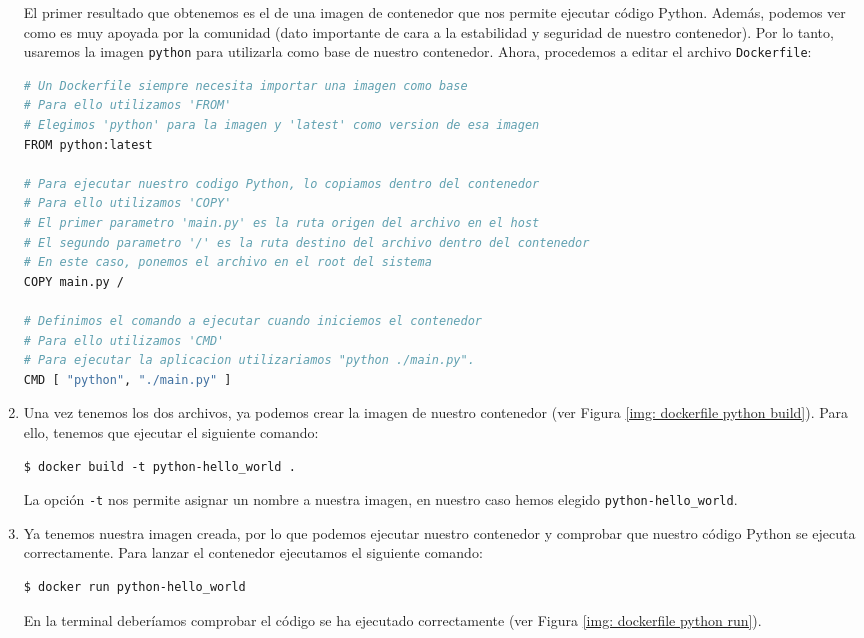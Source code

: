\documentclass[a4paper, oneside, 12pt]{book}
\begin{document}
\begin{enumerate}
	\noindent El primer resultado que obtenemos es el de una imagen de contenedor que nos permite ejecutar código Python. Además, podemos ver como es muy apoyada por la comunidad (dato importante de cara a la estabilidad y seguridad de nuestro contenedor). Por lo tanto, usaremos la imagen \texttt{python} para utilizarla como base de nuestro contenedor. Ahora, procedemos a editar el archivo \texttt{Dockerfile}:
	\begin{lstlisting}[language=bash, caption={Contenido del archivo Dockerfile para crear contenedor con código Python}]
# Un Dockerfile siempre necesita importar una imagen como base
# Para ello utilizamos 'FROM'
# Elegimos 'python' para la imagen y 'latest' como version de esa imagen
FROM python:latest
		
# Para ejecutar nuestro codigo Python, lo copiamos dentro del contenedor
# Para ello utilizamos 'COPY'
# El primer parametro 'main.py' es la ruta origen del archivo en el host
# El segundo parametro '/' es la ruta destino del archivo dentro del contenedor
# En este caso, ponemos el archivo en el root del sistema
COPY main.py /
		
# Definimos el comando a ejecutar cuando iniciemos el contenedor
# Para ello utilizamos 'CMD'
# Para ejecutar la aplicacion utilizariamos "python ./main.py".
CMD [ "python", "./main.py" ]
	\end{lstlisting}
	
	\pagebreak
	
	\item Una vez tenemos los dos archivos, ya podemos crear la imagen de nuestro contenedor (ver Figura \ref{img: dockerfile python build}). Para ello, tenemos que ejecutar el siguiente comando:
	\begin{verbatim}
$ docker build -t python-hello_world .
	\end{verbatim}

	\noindent La opción \texttt{-t} nos permite asignar un nombre a nuestra imagen, en nuestro caso hemos elegido \texttt{python-hello\_world}.
	
	\item Ya tenemos nuestra imagen creada, por lo que podemos ejecutar nuestro contenedor y comprobar que nuestro código Python se ejecuta correctamente. Para lanzar el contenedor ejecutamos el siguiente comando:
	\begin{verbatim}
$ docker run python-hello_world
	\end{verbatim}

	\noindent En la terminal deberíamos comprobar el código se ha ejecutado correctamente (ver Figura \ref{img: dockerfile python run}).
	

\end{enumerate}
\end{document}
